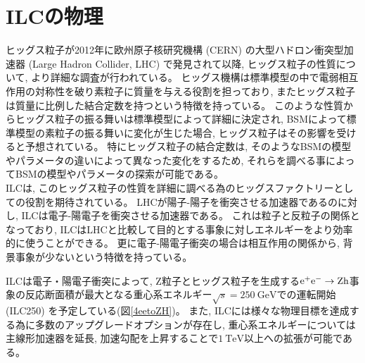 \section{ILCの物理} \label{Intro:PhysicsofILC}

ヒッグス粒子が2012年に欧州原子核研究機構 (CERN) の大型ハドロン衝突型加速器 (Large Hadron Collider, LHC) で発見されて以降, ヒッグス粒子の性質について, より詳細な調査が行われている。
ヒッグス機構は標準模型の中で電弱相互作用の対称性を破り素粒子に質量を与える役割を担っており, またヒッグス粒子は質量に比例した結合定数を持つという特徴を持っている。
このような性質からヒッグス粒子の振る舞いは標準模型によって詳細に決定され, BSMによって標準模型の素粒子の振る舞いに変化が生じた場合, ヒッグス粒子はその影響を受けると予想されている。
特にヒッグス粒子の結合定数は, そのようなBSMの模型やパラメータの違いによって異なった変化をするため, それらを調べる事によってBSMの模型やパラメータの探索が可能である。\\

ILCは, このヒッグス粒子の性質を詳細に調べる為のヒッグスファクトリーとしての役割を期待されている。
LHCが陽子-陽子を衝突させる加速器であるのに対し, ILCは電子-陽電子を衝突させる加速器である。
これは粒子と反粒子の関係となっており, ILCはLHCと比較して目的とする事象に対しエネルギーをより効率的に使うことができる。
更に電子-陽電子衝突の場合は相互作用の関係から, 背景事象が少ないという特徴を持っている。

ILCは電子・陽電子衝突によって, Z粒子とヒッグス粒子を生成する$\rm e^+e^- \to Zh$事象の反応断面積が最大となる重心系エネルギー$\sqrt{s}=250\ \mathrm{GeV}$での運転開始 (ILC250) を予定している(図\ref{4eetoZH})。
また, ILCには様々な物理目標を達成する為に多数のアップグレードオプションが存在し, 重心系エネルギーについては主線形加速器を延長, 加速勾配を上昇することで$1\ \mathrm{TeV}$以上への拡張が可能である。\\

